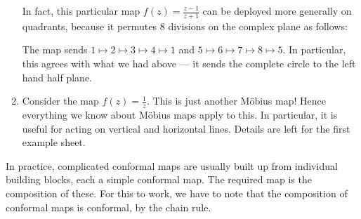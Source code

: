 \documentclass[a4paper]{article}
\begin{document}
\begin{eg}
\begin{enumerate}
      In fact, this particular map $f(z) = \frac{z - 1}{z + 1}$ can be deployed more generally on quadrants, because it permutes $8$ divisions on the complex plane as follows:
      \begin{center}
      \end{center}
      The map sends $1 \mapsto 2 \mapsto 3 \mapsto 4 \mapsto 1$ and $5 \mapsto 6 \mapsto 7 \mapsto 8 \mapsto 5$. In particular, this agrees with what we had above --- it sends the complete circle to the left hand half plane.
    \item Consider the map $f(z) = \frac{1}{z}$. This is just another M\"obius map! Hence everything we know about M\"obius maps apply to this. In particular, it is useful for acting on vertical and horizontal lines. Details are left for the first example sheet.
  \end{enumerate}
\end{eg}
In practice, complicated conformal maps are usually built up from individual building blocks, each a simple conformal map. The required map is the composition of these. For this to work, we have to note that the composition of conformal maps is conformal, by the chain rule.
\end{document}
